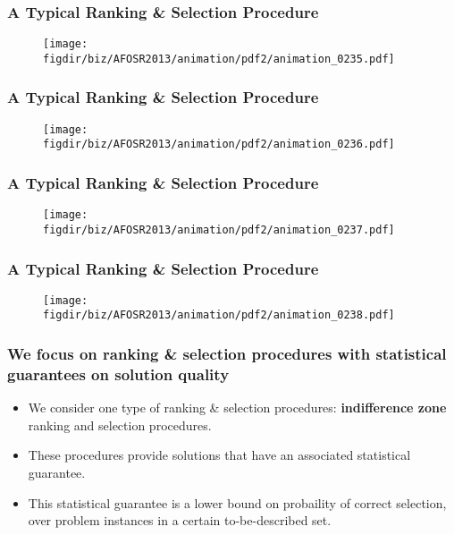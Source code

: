 \documentclass[13pt]{beamer}
\newcommand{\figdir}{../../fig}
\begin{document}
\begin{frame}\frametitle{A Typical Ranking \& Selection Procedure}\begin{figure}\texttt{[image: \\figdir/biz/AFOSR2013/animation/pdf2/animation\_0235.pdf]}\end{figure}\end{frame}
\begin{frame}\frametitle{A Typical Ranking \& Selection Procedure}\begin{figure}\texttt{[image: \\figdir/biz/AFOSR2013/animation/pdf2/animation\_0236.pdf]}\end{figure}\end{frame}
\begin{frame}\frametitle{A Typical Ranking \& Selection Procedure}\begin{figure}\texttt{[image: \\figdir/biz/AFOSR2013/animation/pdf2/animation\_0237.pdf]}\end{figure}\end{frame}
\begin{frame}\frametitle{A Typical Ranking \& Selection Procedure}\begin{figure}\texttt{[image: \\figdir/biz/AFOSR2013/animation/pdf2/animation\_0238.pdf]}\end{figure}\end{frame}

\begin{frame}\frametitle{We focus on ranking \& selection procedures with statistical guarantees on solution quality}
  \begin{itemize}
    \item We consider one type of ranking \& selection procedures: {\bf indifference zone} ranking and selection procedures.
    \item These procedures provide solutions that have an associated statistical guarantee.
    \item This statistical guarantee is a lower bound on probaility of correct selection, over problem instances in a certain to-be-described set.
  \end{itemize}
\end{frame}
\end{document}
